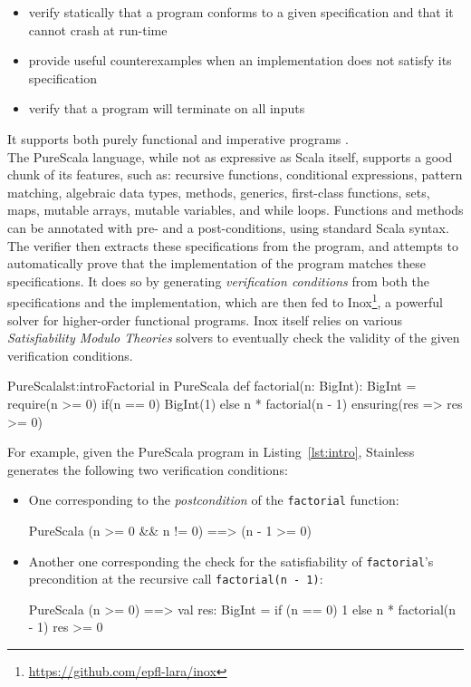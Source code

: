 \documentclass[a4paper,twoside]{article}
\newcommand{\RefCode}[1]{Listing~\ref{#1}}
\newcommand{\stt}[1]{\texttt{\small{#1}}}
\begin{document}
\begin{itemize}
\item verify statically that a program conforms to a given specification and that it cannot crash at run-time
\item provide useful counterexamples when an implementation does not satisfy its specification
\item verify that a program will terminate on all inputs
\end{itemize}

It supports both purely functional and imperative programs \cite{Blanc:2013:OLV:2489837.2489838, xlang}.\\

The PureScala language, while not as expressive as Scala itself, supports a good chunk of its features, such as: recursive functions, conditional expressions, pattern matching, algebraic data types, methods, generics, first-class functions, sets, maps, mutable arrays, mutable variables, and while loops. Functions and methods can be annotated with pre- and a post-conditions, using standard Scala syntax. The verifier then extracts these specifications from the program, and attempts to automatically prove that the implementation of the program matches these specifications. It does so by generating \textit{verification conditions} from both the specifications and the implementation, which are then fed to Inox\footnote{\url{https://github.com/epfl-lara/inox}}, a powerful solver for higher-order functional programs. Inox itself relies on various \textit{Satisfiability Modulo Theories} \cite{53e486195688442995f82bfe28c55731} solvers to eventually check the validity of the given verification conditions.

\begin{Code}{PureScala}{lst:intro}{Factorial in PureScala}
def factorial(n: BigInt): BigInt = {
  require(n >= 0)
  if(n == 0) {
    BigInt(1)
  } else {
    n * factorial(n - 1)
  }
} ensuring(res => res >= 0)
\end{Code}

\clearpage

For example, given the PureScala program in \RefCode{lst:intro}, Stainless generates the following two verification conditions:

\begin{itemize}
\item One corresponding to the \textit{postcondition} of the \stt{factorial} function:
\begin{ShortCode}{PureScala}
(n >= 0 && n != 0) ==> (n - 1 >= 0)
\end{ShortCode}
\item Another one corresponding the check for the satisfiability of \stt{factorial}'s precondition at the recursive call \stt{factorial(n - 1)}:
\begin{ShortCode}{PureScala}
(n >= 0) ==> {
  val res: BigInt = if (n == 0) {
    1
  } else {
    n * factorial(n - 1)
 }
  res >= 0
}
\end{ShortCode}
\end{itemize}
\end{document}
